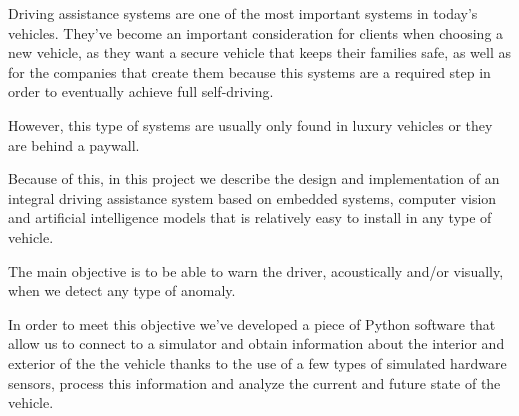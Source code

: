 \label{sec_resumen}

Driving assistance systems are one of the most important systems in today's vehicles.
They've become an important consideration for clients when choosing a new vehicle, as they want a secure vehicle that keeps their families safe, as well as for the companies that create them because this systems are a required step in order to eventually achieve full self-driving.

However, this type of systems are usually only found in luxury vehicles or they are behind a paywall.

Because of this, in this project we describe the design and implementation of an integral driving assistance system based on embedded systems, computer vision and artificial intelligence models that is relatively easy to install in any type of vehicle.

The main objective is to be able to warn the driver, acoustically and/or visually, when we detect any type of anomaly. 

In order to meet this objective we've developed a piece of Python software that allow us to connect to a simulator and obtain information about the interior and exterior of the the vehicle thanks to the use of a few types of simulated hardware sensors, process this information and analyze the current and future state of the vehicle.